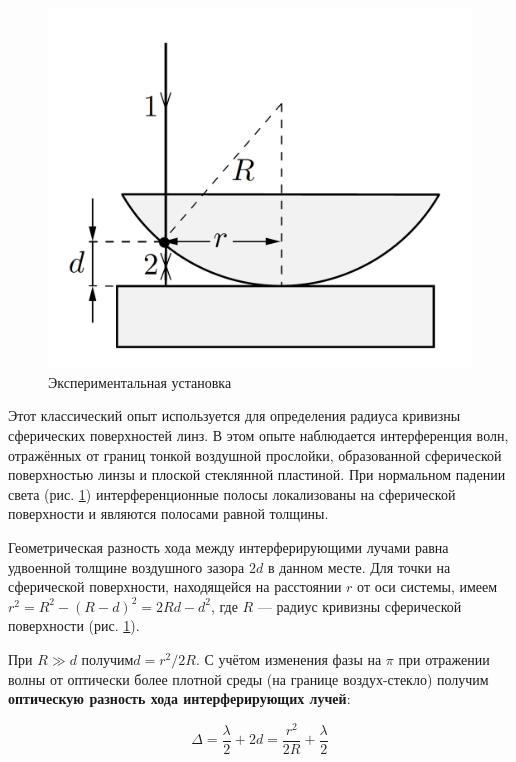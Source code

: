 \documentclass[12pt]{kiarticle}
\begin{document}
	\begin{figure} 
		\includegraphics[width=\linewidth]{ring}
		\caption{Экспериментальная установка}
		\label{ring}
	\end{figure}

	Этот классический опыт используется для определения радиуса кривизны сферических поверхностей линз. В этом опыте наблюдается интерференция волн, отражённых от границ тонкой воздушной прослойки, образованной сферической поверхностью линзы и плоской стеклянной пластиной. При нормальном падении света (рис. \ref{ring}) интерференционные полосы локализованы на сферической поверхности и являются полосами равной толщины.
	
	Геометрическая разность хода между интерферирующими лучами равна удвоенной толщине воздушного зазора $ 2d $ в данном месте. Для точки на сферической поверхности, находящейся на расстоянии $ r $ от оси системы, имеем $ r^2 = R^2 - (R - d)^2 = 2Rd - d^2 $, где $ R $ --- радиус кривизны сферической поверхности (рис. \ref{ring}).
	
	При $ R \gg d $ получим$  d = r^2/2R $. С учётом изменения фазы на $ \pi $ при отражении волны от оптически более плотной среды (на границе воздух-стекло) получим \textbf{оптическую разность хода интерферирующих лучей}:
	
	\begin{equation}\label{r_m}
	\Delta = \dfrac{\lambda}{2} + 2d = \dfrac{r^2}{2R} + \dfrac{\lambda}{2}
	\end{equation}
	
\end{document}
